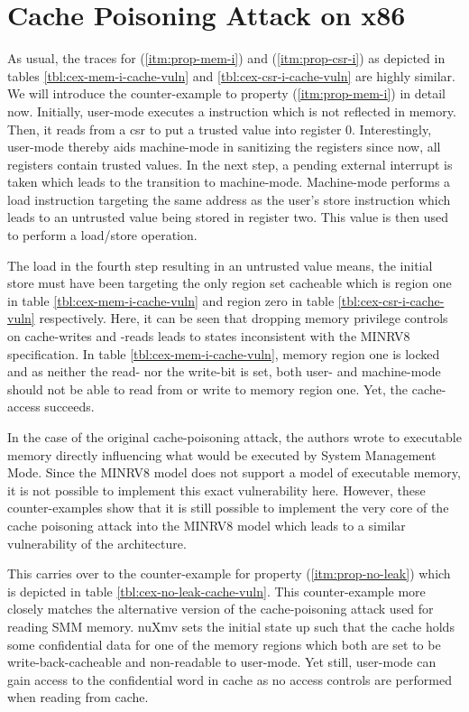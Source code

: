 \section{Cache Poisoning Attack on x86}
\label{sec:cexs-cache-vuln}

As usual, the traces for  (\ref{itm:prop-mem-i}) and  (\ref{itm:prop-csr-i}) as depicted in tables \ref{tbl:cex-mem-i-cache-vuln} and \ref{tbl:cex-csr-i-cache-vuln} are highly similar.
We will introduce the counter-example to property  (\ref{itm:prop-mem-i}) in detail now.
Initially, user-mode executes a  instruction which is not reflected in memory.
Then, it reads from a \gls{csr} to put a trusted value into register 0.
Interestingly, user-mode thereby aids machine-mode in sanitizing the registers since now, all registers contain trusted values.
In the next step, a pending external interrupt is taken which leads to the transition to machine-mode.
Machine-mode performs a load instruction targeting the same address as the user's store instruction which leads to an untrusted value being stored in register two.
This value is then used to perform a load/store operation.

The load in the fourth step resulting in an untrusted value means, the initial store must have been targeting the only region set cacheable which is region one in table \ref{tbl:cex-mem-i-cache-vuln} and region zero in table \ref{tbl:cex-csr-i-cache-vuln} respectively.
Here, it can be seen that dropping memory privilege controls on cache-writes and -reads leads to states inconsistent with the MINRV8 specification.
In table \ref{tbl:cex-mem-i-cache-vuln}, memory region one is locked and as neither the read- nor the write-bit is set, both user- and machine-mode should not be able to read from or write to memory region one.
Yet, the cache-access succeeds.

In the case of the original cache-poisoning attack, the authors wrote to executable memory directly influencing what would be executed by System Management Mode.
Since the MINRV8 model does not support a model of executable memory, it is not possible to implement this exact vulnerability here.
However, these counter-examples show that it is still possible to implement the very core of the cache poisoning attack into the MINRV8 model which leads to a similar vulnerability of the architecture.

This carries over to the counter-example for property  (\ref{itm:prop-no-leak}) which is depicted in table \ref{tbl:cex-no-leak-cache-vuln}.
This counter-example more closely matches the alternative version of the cache-poisoning attack used for reading SMM memory.
nuXmv sets the initial state up such that the cache holds some confidential data for one of the memory regions which both are set to be write-back-cacheable and non-readable to user-mode.
Yet still, user-mode can gain access to the confidential word in cache as no access controls are performed when reading from cache.

